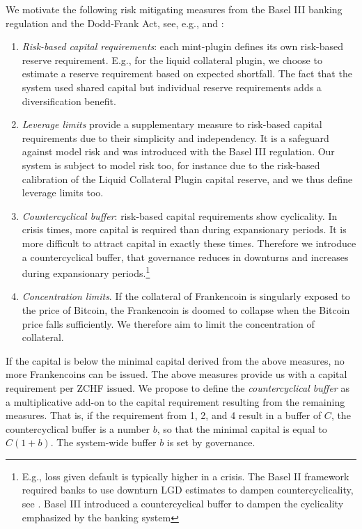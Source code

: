 \documentclass[english,11pt]{article}
\begin{document}
We motivate the following risk mitigating measures from 
the Basel III banking regulation and the Dodd-Frank Act, see, e.g., \cite{basel3}
and \cite{acharya2010regulating}:
\begin{enumerate}
\item \emph{Risk-based capital requirements}: each mint-plugin defines its own
	risk-based reserve requirement. E.g., for the liquid collateral
	plugin, we choose to estimate a reserve requirement based on expected shortfall.
	The fact that the system used shared capital but individual reserve requirements
	adds a diversification benefit.
\item \emph{Leverage limits} provide a supplementary measure to
	risk-based capital requirements due to their simplicity and independency. 
	It is a safeguard against model risk and was introduced with the
	Basel III regulation. Our system is subject to model risk too, for instance
	due to the risk-based calibration of the Liquid Collateral Plugin capital
	reserve, and we thus define leverage limits too.
\item \emph{Countercyclical buffer}: risk-based capital requirements
	show cyclicality. In crisis times, more capital is required
	than during expansionary periods. It is more difficult to
	attract capital in exactly these times. Therefore we
	introduce a countercyclical buffer, that governance reduces
	in downturns and increases during expansionary periods.\footnote{E.g., 
	loss given default is typically higher
	in a crisis. The Basel II framework required banks to use downturn LGD
	estimates to dampen countercyclicality, see \cite{engelmann2006basel}.
	Basel III introduced a countercyclical buffer to dampen the cyclicality
	emphasized by the banking system}
\item \emph{Concentration limits}. If the collateral of Frankencoin
	is singularly exposed to the price of Bitcoin, the Frankencoin is doomed
	to collapse when the Bitcoin price falls sufficiently. We therefore aim
	to limit the concentration of collateral. 
\end{enumerate}

If the capital is below the minimal capital derived from the above measures,
no more Frankencoins can be issued.
The above measures provide us with a capital requirement per ZCHF issued.
We propose to define the \emph{countercyclical buffer} as a multiplicative add-on to the
capital requirement resulting from the remaining measures. That is,
if the requirement from 1, 2, and 4 result in a buffer of $C$, the
countercyclical buffer is a number $b$, so that the minimal capital is equal
to $C(1+b)$. The system-wide buffer $b$ is set by governance.
\end{document}
